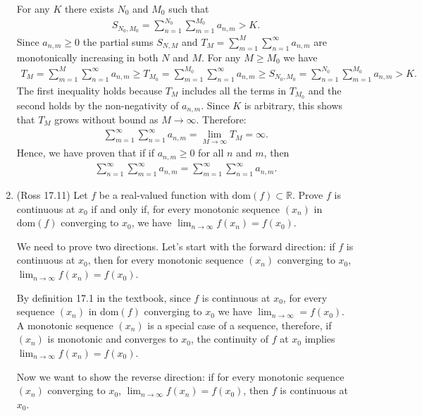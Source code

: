 \documentclass [10pt]{article}
\newcommand{\jg}[1]{{\color{blue} #1}}
\begin{document}
\begin{enumerate}
{For any $K$ there exists $N_0$ and $M_0$ such that 
\begin{align*}
    S_{N_0, M_0} = \sum_{n=1}^{N_0} \sum_{m=1}^{M_0} a_{n,m} > K.
\end{align*}
Since $a_{n,m} \geq 0$ the partial sums $S_{N,M}$ and $T_M = \sum_{m=1}^M \sum_{n=1}^\infty a_{n,m}$ are monotonically increasing in both $N$ and $M$. For any $M \geq M_0$ we have
\begin{align*}
    T_M = \sum_{m=1}^{M} \sum_{n=1}^\infty a_{n,m} \geq T_{M_0} = \sum_{m=1}^{M_0} \sum_{n=1}^\infty a_{n,m} \geq S_{N_0, M_0} = \sum_{n=1}^{N_0} \sum_{m=1}^{M_0} a_{n,m} > K.
\end{align*}
The first inequality holds because $T_M$ includes all the terms in $T_{M_0}$ and the second holds by the non-negativity of $a_{n,m}$. Since $K$ is arbitrary, this shows that $T_M$ grows without bound as $M \to \infty$. Therefore:
\begin{align*}
    \sum_{m=1}^{\infty} \sum_{n=1}^{\infty} a_{n, m} = \lim_{M\to \infty} T_M = \infty.
\end{align*}
Hence, we have proven that if if $a_{n, m} \geq 0$ for all $n$ and $m$, then
\begin{align*}
\sum_{n=1}^{\infty} \sum_{m=1}^{\infty} a_{n, m}=\sum_{m=1}^{\infty} \sum_{n=1}^{\infty} a_{n, m}.
\end{align*}


}
\clearpage

\item (Ross 17.11) Let $f$ be a real-valued function with $\mbox{dom}(f) \subset \mathbb{R}$. Prove $f$ is continuous at $x_0$ if and only if, for every monotonic sequence $\left(x_n\right)$ in $\mbox{dom}(f)$ converging to $x_0$, we have $\lim_{n \to \infty} f(x_n)=f(x_0)$.

\jg{
We need to prove two directions. Let's start with the forward direction: if $f$ is continuous at $x_0$, then for every monotonic sequence $(x_n)$ converging to $x_0$, $\lim_{n \to \infty} f(x_n) = f(x_0)$. 

By definition 17.1 in the textbook, since $f$ is continuous at $x_0$, for every sequence $(x_n)$ in dom$(f)$ converging to $x_0$ we have $\lim_{n\to \infty} = f(x_0)$. A monotonic sequence $(x_n)$ is a special case of a sequence, therefore, if $(x_n)$ is monotonic and converges to $x_0$, the continuity of $f$ at $x_0$ implies $\lim_{n\to \infty} f(x_n) = f(x_0)$. 

Now we want to show the reverse direction: if for every monotonic sequence $(x_n)$ converging to $x_0$, $\lim_{n\to \infty} f(x_n) = f(x_0)$, then $f$ is continuous at $x_0$. 

}
\end{enumerate}
\end{document}
